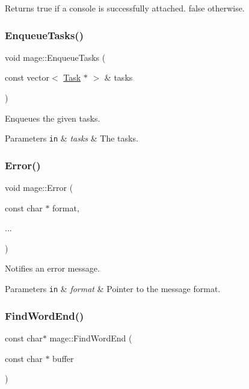 \begin{DoxyReturn}{Returns}
{\ttfamily true} if a console is successfully attached. {\ttfamily false} otherwise. 
\end{DoxyReturn}
\hypertarget{namespacemage_a0f0fa32534696afa66b313ffebbf9caf}{}\label{namespacemage_a0f0fa32534696afa66b313ffebbf9caf} 
\subsubsection{\texorpdfstring{Enqueue\+Tasks()}{EnqueueTasks()}}
{\footnotesize\ttfamily void mage\+::\+Enqueue\+Tasks (\begin{DoxyParamCaption}\item[{const vector$<$ \hyperlink{classmage_1_1_task}{Task} $\ast$ $>$ \&}]{tasks }\end{DoxyParamCaption})}

Enqueues the given tasks.


\begin{DoxyParams}[1]{Parameters}
\mbox{\tt in}  & {\em tasks} & The tasks. \\
\hline
\end{DoxyParams}
\hypertarget{namespacemage_a52a7fe8c9ce39afd9e0b0299373db0fa}{}\label{namespacemage_a52a7fe8c9ce39afd9e0b0299373db0fa} 
\subsubsection{\texorpdfstring{Error()}{Error()}}
{\footnotesize\ttfamily void mage\+::\+Error (\begin{DoxyParamCaption}\item[{const char $\ast$}]{format,  }\item[{}]{... }\end{DoxyParamCaption})}

Notifies an error message.


\begin{DoxyParams}[1]{Parameters}
\mbox{\tt in}  & {\em format} & Pointer to the message format. \\
\hline
\end{DoxyParams}
\hypertarget{namespacemage_ab2e62d950dc620167f4128cb16033998}{}\label{namespacemage_ab2e62d950dc620167f4128cb16033998} 
\subsubsection{\texorpdfstring{Find\+Word\+End()}{FindWordEnd()}}
{\footnotesize\ttfamily const char$\ast$ mage\+::\+Find\+Word\+End (\begin{DoxyParamCaption}\item[{const char $\ast$}]{buffer }\end{DoxyParamCaption})}

